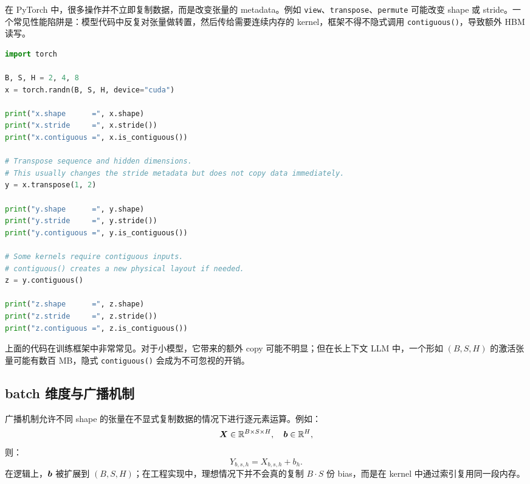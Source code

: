 在 PyTorch 中，很多操作并不立即复制数据，而是改变张量的 metadata。例如 \texttt{view}、\texttt{transpose}、\texttt{permute} 可能改变 shape 或 stride。一个常见性能陷阱是：模型代码中反复对张量做转置，然后传给需要连续内存的 kernel，框架不得不隐式调用 \texttt{contiguous()}，导致额外 HBM 读写。

\begin{lstlisting}[language=Python,caption={观察 PyTorch 张量的 shape、stride 与 contiguous 状态},label={lst:pytorch-shape-stride}]
import torch

B, S, H = 2, 4, 8
x = torch.randn(B, S, H, device="cuda")

print("x.shape      =", x.shape)
print("x.stride     =", x.stride())
print("x.contiguous =", x.is_contiguous())

# Transpose sequence and hidden dimensions.
# This usually changes the stride metadata but does not copy data immediately.
y = x.transpose(1, 2)

print("y.shape      =", y.shape)
print("y.stride     =", y.stride())
print("y.contiguous =", y.is_contiguous())

# Some kernels require contiguous inputs.
# contiguous() creates a new physical layout if needed.
z = y.contiguous()

print("z.shape      =", z.shape)
print("z.stride     =", z.stride())
print("z.contiguous =", z.is_contiguous())
\end{lstlisting}

上面的代码在训练框架中非常常见。对于小模型，它带来的额外 copy 可能不明显；但在长上下文 LLM 中，一个形如 $(B,S,H)$ 的激活张量可能有数百 MB，隐式 \texttt{contiguous()} 会成为不可忽视的开销。

\subsection{batch 维度与广播机制}
\label{subsec:batch-broadcasting}

广播机制允许不同 shape 的张量在不显式复制数据的情况下进行逐元素运算。例如：
\[
  \bm{X}\in\mathbb{R}^{B\times S\times H},
  \quad
  \bm{b}\in\mathbb{R}^{H},
\]
则：
\[
  Y_{b,s,h}=X_{b,s,h}+b_h.
\]
在逻辑上，$\bm{b}$ 被扩展到 $(B,S,H)$；在工程实现中，理想情况下并不会真的复制 $B\cdot S$ 份 bias，而是在 kernel 中通过索引复用同一段内存。

